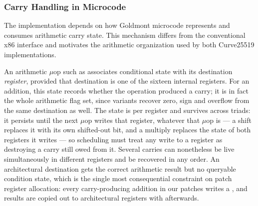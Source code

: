 
\subsubsection{Carry Handling in Microcode}
\label{sec:c25519-carries}

The implementation depends on how Goldmont microcode represents and consumes
arithmetic carry state.
This mechanism differs from the conventional x86 interface and motivates the
arithmetic organization used by both Curve25519 implementations.

An arithmetic $\mu$op such as  associates conditional state with its
destination \emph{register}, provided that destination is one of the sixteen
internal  registers.
For an addition, this state records whether the operation produced a carry;
it is in fact the whole arithmetic flag set, since  variants
recover zero, sign and overflow from the same destination as well.
The state is per register and survives across triads: it persists until the
next $\mu$op writes that register, whatever that $\mu$op is --- a shift
replaces it with its own shifted-out bit, and a multiply replaces the state of
both registers it writes --- so scheduling must treat any write to a register
as destroying a carry still owed from it.
Several carries can nonetheless be live simultaneously in different registers
and be recovered in any order.
An architectural destination gets the correct arithmetic result but no
queryable condition state, which is the single most consequential constraint
on patch register allocation: every carry-producing addition in our patches
writes a , and results are copied out to architectural registers
with  afterwards.

